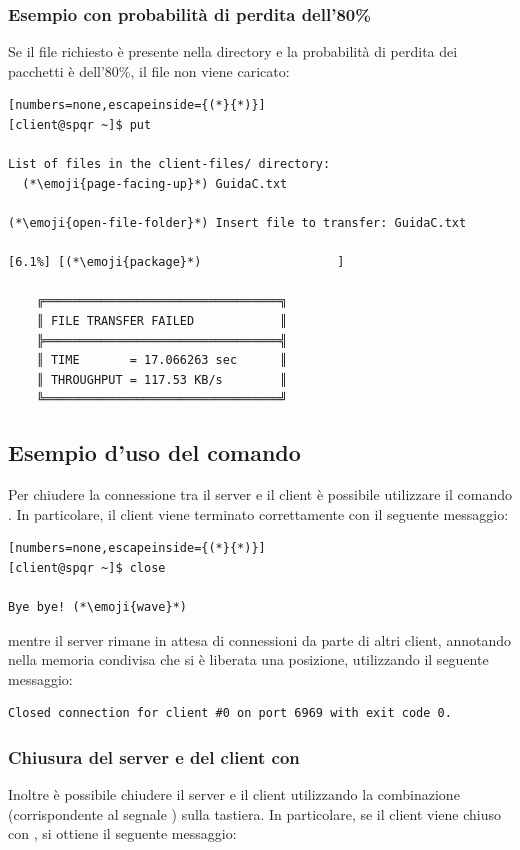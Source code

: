 \subsubsection{Esempio con probabilità di perdita dell'80\%}
Se il file richiesto è presente nella directory  e la probabilità di perdita dei pacchetti è dell'80\%, il file non viene caricato:

\begin{lstlisting}[numbers=none,escapeinside={(*}{*)}]
[client@spqr ~]$ put

List of files in the client-files/ directory:
  (*\emoji{page-facing-up}*) GuidaC.txt

(*\emoji{open-file-folder}*) Insert file to transfer: GuidaC.txt

[6.1%] [(*\emoji{package}*)                   ]

    ╔═════════════════════════════════╗
    ║ FILE TRANSFER FAILED            ║
    ╠═════════════════════════════════╣
    ║ TIME       = 17.066263 sec      ║
    ║ THROUGHPUT = 117.53 KB/s        ║
    ╚═════════════════════════════════╝
\end{lstlisting}

\subsection{Esempio d'uso del comando }
Per chiudere la connessione tra il server e il client è possibile utilizzare il comando .
In particolare, il client viene terminato correttamente con il seguente messaggio:

\begin{lstlisting}[numbers=none,escapeinside={(*}{*)}]
[client@spqr ~]$ close

Bye bye! (*\emoji{wave}*)
\end{lstlisting}

mentre il server rimane in attesa di connessioni da parte di altri client, annotando nella memoria condivisa che si è liberata una posizione, utilizzando il seguente messaggio:

\begin{lstlisting}[numbers=none]
Closed connection for client #0 on port 6969 with exit code 0.
\end{lstlisting}

\subsubsection{Chiusura del server e del client con }
Inoltre è possibile chiudere il server e il client utilizzando la combinazione  (corrispondente al segnale ) sulla tastiera.
In particolare, se il client viene chiuso con , si ottiene il seguente messaggio:

